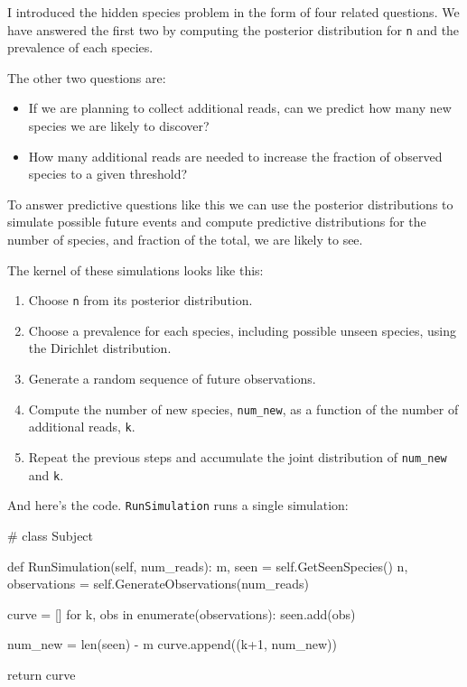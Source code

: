 \documentclass[12pt]{book}
\theoremstyle{exercise}
\begin{document}
I introduced the hidden species problem in the form of four related
questions.  We have answered the first two by computing the posterior
distribution for {\tt n} and the prevalence of each species.

The other two questions are:

\begin{itemize}

\item If we are planning to collect additional reads, can we predict
  how many new species we are likely to discover?

\item How many additional reads are needed to increase the
  fraction of observed species to a given threshold?

\end{itemize}

To answer predictive questions like this we can use the posterior
distributions to simulate possible future events and compute
predictive distributions for the number of species, and fraction of
the total, we are likely to see.

The kernel of these simulations looks like this:

\begin{enumerate}

\item Choose {\tt n} from its posterior distribution.

\item Choose a prevalence for each species, including possible unseen
  species, using the Dirichlet distribution.

\item Generate a random sequence of future observations.

\item Compute the number of new species, \verb"num_new", as a function
  of the number of additional reads, {\tt k}.

\item Repeat the previous steps and accumulate the joint distribution
  of \verb"num_new" and {\tt k}.

\end{enumerate}

And here's the code.  {\tt RunSimulation} runs a single simulation:

\begin{code}
# class Subject

    def RunSimulation(self, num_reads):
        m, seen = self.GetSeenSpecies()
        n, observations = self.GenerateObservations(num_reads)

        curve = []
        for k, obs in enumerate(observations):
            seen.add(obs)

            num_new = len(seen) - m
            curve.append((k+1, num_new))

        return curve
\end{code}
\end{document}
